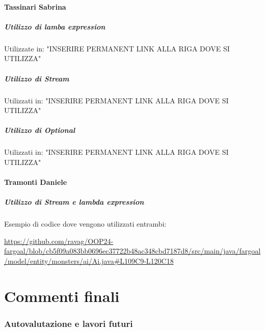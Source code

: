 \documentclass{report}
\begin{document}
\subsubsection{Tassinari Sabrina}
\paragraph{Utilizzo di lamba expression}
Utilizzate in: "INSERIRE PERMANENT LINK ALLA RIGA DOVE SI UTILIZZA"

\paragraph{Utilizzo di Stream}
Utilizzati in: "INSERIRE PERMANENT LINK ALLA RIGA DOVE SI UTILIZZA"

\paragraph{Utilizzo di Optional}
Utilizzati in: "INSERIRE PERMANENT LINK ALLA RIGA DOVE SI UTILIZZA"

\subsubsection{Tramonti Daniele}
\paragraph{Utilizzo di Stream e lambda expression}
Esempio di codice dove vengono utilizzati entrambi:
\begin{sloppypar}
\url{https://github.com/ravag/OOP24-fargoal/blob/cb5f09a083bb0696ec37722b48ac348cbd7187d8/src/main/java/fargoal/model/entity/monsters/ai/Ai.java#L109C9-L120C18}
\end{sloppypar}

\chapter{Commenti finali}

\subsection{Autovalutazione e lavori futuri}
\end{document}
